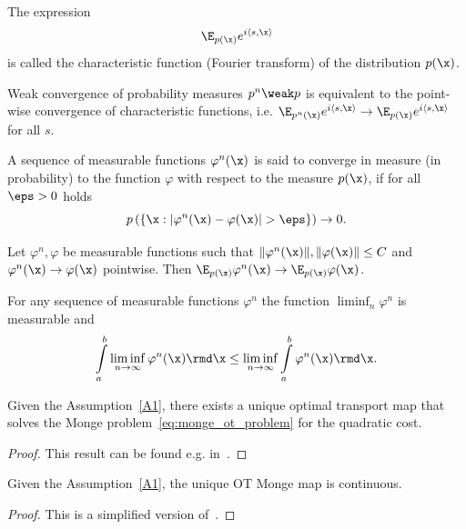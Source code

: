 \begin{definition}
    The expression
    \begin{equation}
        \E_{p(\x)} e^{i \langle s , \x \rangle}
    \end{equation}
    is called the characteristic function (Fourier transform) of the distribution $p(\x)$. 
\end{definition}

\begin{theorem}[Lévy]
\label{thm:continuity}
    Weak convergence of probability measures $p^n \weak p$ is equivalent to the point-wise convergence of characteristic functions, i.e. $\E_{p^n(\x)} e^{i \langle s , \x \rangle} \rightarrow \E_{p(\x)} e^{i \langle s , \x \rangle}$ for all $s$.
\end{theorem}

\begin{definition}
    A sequence of measurable functions $\varphi^n(\x)$ is said to converge in measure (in probability) to the function $\varphi$ with respect to the measure $p(\x)$, if for all $\eps > 0$ holds
    \[
        p\left(\{\x : |\varphi^n(\x) - \varphi(\x)| > \eps \}\right) \rightarrow 0.
    \]
\end{definition}

\begin{theorem}[Lebesgue]
\label{thm:lebesgue}
    Let $\varphi^n, \varphi$ be measurable functions such that $\|\varphi^n(\x)\|, \|\varphi(\x)\| \leq C$ and $\varphi^n(\x) \rightarrow \varphi(\x)$ pointwise. Then $\E_{p(\x)}\varphi^n(\x) \rightarrow \E_{p(\x)}\varphi(\x)$.
\end{theorem}

\begin{lemma}[Fatou]
\label{thm:fatou}
    For any sequence of measurable functions $\varphi^n$ the function $\liminf_n \varphi^n$ is measurable and
    \begin{equation}
        \int\limits_{a}^{b}\liminf\limits_{n \rightarrow \infty} \varphi^n(\x) \rmd \x \leq \liminf\limits_{n \rightarrow \infty} \int\limits_{a}^{b} \varphi^n(\x) \rmd \x.
    \end{equation}
\end{lemma}



\begin{theorem}
\label{thm:brenier}
    Given the Assumption~\ref{A1}, there exists a unique optimal transport map that solves the Monge problem~\ref{eq:monge_ot_problem} for the quadratic cost.
\end{theorem}
\begin{proof}
This result can be found e.g. in~\citep[Theorem~3.1]{de2014monge}.
\end{proof}
\begin{theorem}
\label{thm:ot_continuous}
    Given the Assumption~\ref{A1}, the unique OT Monge map is continuous.
\end{theorem}
\begin{proof}
This is a simplified version of~\citep[Theorem~3.3]{de2014monge}.
\end{proof}

